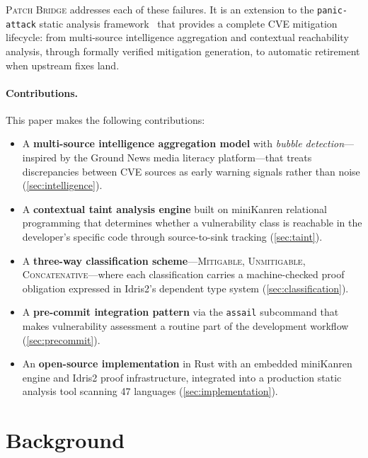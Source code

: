 \documentclass[11pt,twocolumn]{article}
\begin{document}
\textsc{Patch Bridge} addresses each of these failures. It is an
extension to the \texttt{panic-attack} static analysis
framework~\cite{panic-attack} that provides a complete CVE mitigation
lifecycle: from multi-source intelligence aggregation and contextual
reachability analysis, through formally verified mitigation generation,
to automatic retirement when upstream fixes land.

\paragraph{Contributions.} This paper makes the following contributions:

\begin{itemize}[nosep]
  \item A \textbf{multi-source intelligence aggregation model} with
    \emph{bubble detection}---inspired by the Ground News media
    literacy platform---that treats discrepancies between CVE sources
    as early warning signals rather than noise (\cref{sec:intelligence}).
  \item A \textbf{contextual taint analysis engine} built on miniKanren
    relational programming that determines whether a vulnerability class
    is reachable in the developer's specific code through source-to-sink
    tracking (\cref{sec:taint}).
  \item A \textbf{three-way classification scheme}---\textsc{Mitigable},
    \textsc{Unmitigable}, \textsc{Concatenative}---where each
    classification carries a machine-checked proof obligation expressed
    in Idris2's dependent type system (\cref{sec:classification}).
  \item A \textbf{pre-commit integration pattern} via the
    \texttt{assail} subcommand that makes vulnerability assessment
    a routine part of the development workflow (\cref{sec:precommit}).
  \item An \textbf{open-source implementation} in Rust with an embedded
    miniKanren engine and Idris2 proof infrastructure, integrated into
    a production static analysis tool scanning 47
    languages (\cref{sec:implementation}).
\end{itemize}

\section{Background}
\label{sec:background}
\end{document}

